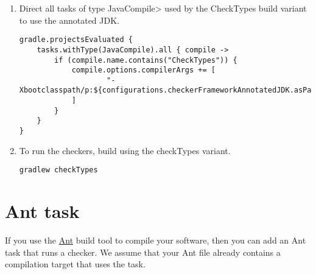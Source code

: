 \begin{enumerate}
\item Direct all tasks of type \<JavaCompile> used by the CheckTypes build variant to use the annotated JDK.
\begin{mysmall}
\begin{Verbatim}
gradle.projectsEvaluated {
    tasks.withType(JavaCompile).all { compile ->
        if (compile.name.contains("CheckTypes")) {
            compile.options.compilerArgs += [
                    "-Xbootclasspath/p:${configurations.checkerFrameworkAnnotatedJDK.asPath}"
            ]
        }
    }
}
\end{Verbatim}
\end{mysmall}

\item To run the checkers, build using the checkTypes variant.
\begin{Verbatim}
gradlew checkTypes
\end{Verbatim}

\end{enumerate}


\section{Ant task\label{ant-task}}

If you use the \href{http://ant.apache.org/}{Ant} build tool to compile
your software, then you can add an Ant task that runs a checker.  We assume
that your Ant file already contains a compilation target that uses the
 task.

